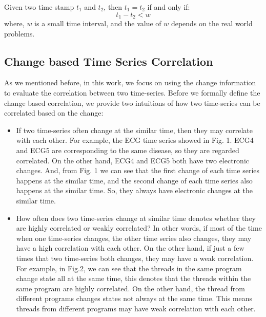 \begin{definition}
	Given two time stamp $t_1$ and $t_2$, then $t_1 = t_2$ if and only if:
	\begin{equation}
	t_1 - t_2 < w
	\end{equation}
	where, $w$ is a small time interval, and the value of $w$ depends on the real world problems.
\end{definition}

\subsection{Change based Time Series Correlation}

As we mentioned before, in this work, we focus on using the change information to evaluate the correlation between two time-series. 
Before we formally define the change based correlation, we provide two intuitions of how two time-series can be correlated based on the change:

\begin{itemize}
	\item If two time-series often change at the similar time, then they may correlate with each other. 
	For example, the ECG time series showed in Fig. 1. 
	ECG4 and ECG5 are corresponding to the same disease, so they are regarded correlated. On the other hand, ECG4 and ECG5 both have two electronic changes. And, from Fig. 1 we can see that the first change of each time series happens at the similar time, and the second change of each time series also happens at the similar time. So, they always have electronic changes at the similar time.
	\item How often does two time-series change at similar time denotes whether they are highly correlated or weakly correlated? In other words, if most of the time when one time-series changes, the other time series also changes, they may have a high correlation with each other. On the other hand, if just a few times that two time-series both changes, they may have a weak correlation.
	For example, in Fig.2, we can see that the threads in the same program change state all at the same time, this denotes that the threads within the same program are highly correlated. On the other hand, the thread from different programs changes states not always at the same time. This means threads from different programs may have weak correlation with each other.
\end{itemize}

